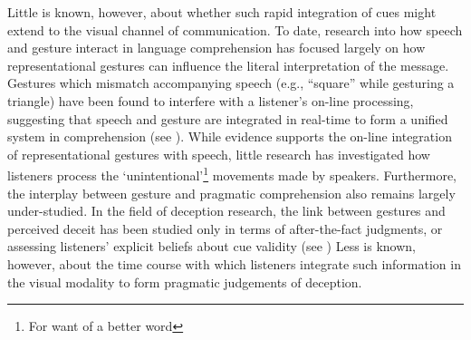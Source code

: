 \documentclass[a4paper,man,natbib]{apa6}
\begin{document}
Little is known, however, about whether such rapid integration of cues might extend to the visual channel of communication. %
To date, research into how speech and gesture interact in language comprehension has focused largely on how representational gestures can influence the literal interpretation of the message.
Gestures which mismatch accompanying speech (e.g., ``square'' while gesturing a triangle) have been found to interfere with a listener's on-line processing, suggesting that speech and gesture are integrated in real-time to form a unified system in comprehension (see \citealt{Kelly2010, Habets2013}).
While evidence supports the on-line integration of representational gestures with speech, little research has investigated how listeners process the `unintentional'\footnote{For want of a better word} movements made by speakers. %
Furthermore, the interplay between gesture and pragmatic comprehension also remains largely under-studied. %
In the field of deception research, the link between gestures and perceived deceit has been studied only in terms of after-the-fact judgments, or assessing listeners' explicit beliefs about cue validity (see \citealt{Vrij1996a, Zuckerman1981a}) %
Less is known, however, about the time course with which listeners integrate such information in the visual modality to form pragmatic judgements of deception.
\end{document}
